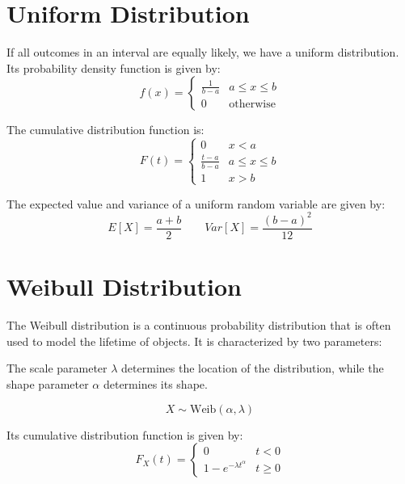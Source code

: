 \section{Uniform Distribution}

If all outcomes in an interval are equally likely, we have a uniform distribution.
Its probability density function is given by:
\[
f(x) = \begin{cases}
    \frac{1}{b-a} & a \leq x \leq b \\
    0 & \text{otherwise}
\end{cases}
\]

The cumulative distribution function is:
\[
F(t) = \begin{cases}
    0 & x < a \\
    \frac{t-a}{b-a} & a \leq x \leq b \\
    1 & x > b
\end{cases}
\]

The expected value and variance of a uniform random variable are given by:
\[
E[X] = \frac{a+b}{2} \qquad Var[X] = \frac{(b-a)^2}{12}
\]


\section{Weibull Distribution}

The Weibull distribution is a continuous probability distribution that is often used to model the lifetime of objects. It is characterized by two parameters:

The scale parameter $\lambda$ determines the location of the distribution, while the shape parameter $\alpha$ determines its shape.

\[
X \sim \text{Weib}(\alpha, \lambda)
\]

Its cumulative distribution function is given by:
\[
F_X(t) = \begin{cases}
    0 \qquad & t < 0 \\
    1 - e^{-\lambda t^\alpha} & t \geq 0
\end{cases}
\]

